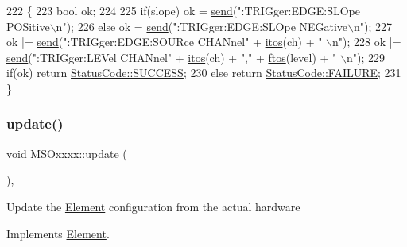 \begin{DoxyCode}
222 \{
223     \textcolor{keywordtype}{bool} ok;
224 
225     \textcolor{keywordflow}{if}(slope) ok  = \hyperlink{classMSOxxxx_ae77668a1ae4ccb74e0ed5f2485dfdebf}{send}(\textcolor{stringliteral}{":TRIGger:EDGE:SLOpe POSitive\(\backslash\)n"});
226     \textcolor{keywordflow}{else}            ok  = \hyperlink{classMSOxxxx_ae77668a1ae4ccb74e0ed5f2485dfdebf}{send}(\textcolor{stringliteral}{":TRIGger:EDGE:SLOpe NEGative\(\backslash\)n"});
227                         ok |= \hyperlink{classMSOxxxx_ae77668a1ae4ccb74e0ed5f2485dfdebf}{send}(\textcolor{stringliteral}{":TRIGger:EDGE:SOURce CHANnel"} + \hyperlink{Tools_8h_af330027dbdafb9a30768b3613c553e60}{itos}(ch) + \textcolor{stringliteral}{" \(\backslash\)n"});
228                         ok |= \hyperlink{classMSOxxxx_ae77668a1ae4ccb74e0ed5f2485dfdebf}{send}(\textcolor{stringliteral}{":TRIGger:LEVel CHANnel"} + \hyperlink{Tools_8h_af330027dbdafb9a30768b3613c553e60}{itos}(ch) + \textcolor{stringliteral}{","} + 
      \hyperlink{classMSOxxxx_ab9c897c3dc0a52cbe5a5da67fc520ed7}{ftos}(level) + \textcolor{stringliteral}{" \(\backslash\)n"});
229     \textcolor{keywordflow}{if}(ok)  \textcolor{keywordflow}{return} \hyperlink{classStatusCode_a6f565cbeadc76d14c72f047e5e85eb4badd0da38d3ba0d922efd1f4619bc37ad8}{StatusCode::SUCCESS};
230     \textcolor{keywordflow}{else}        \textcolor{keywordflow}{return} \hyperlink{classStatusCode_a6f565cbeadc76d14c72f047e5e85eb4ba3da73d4c469762eb9d3c960368252b26}{StatusCode::FAILURE};  
231 \}
\end{DoxyCode}
\mbox{\label{classMSOxxxx_a09452d6e75cd9adfaec93606fbb998dc}} 
\subsubsection{\texorpdfstring{update()}{update()}}
{\footnotesize\ttfamily void M\+S\+Oxxxx\+::update (\begin{DoxyParamCaption}{ }\end{DoxyParamCaption})\hspace{0.3cm}{\ttfamily [inline]}, {\ttfamily [virtual]}}

Update the \hyperlink{classElement}{Element} configuration from the actual hardware 

Implements \hyperlink{classElement_a4e6c83efae95616ebddd03c793a26661}{Element}.



